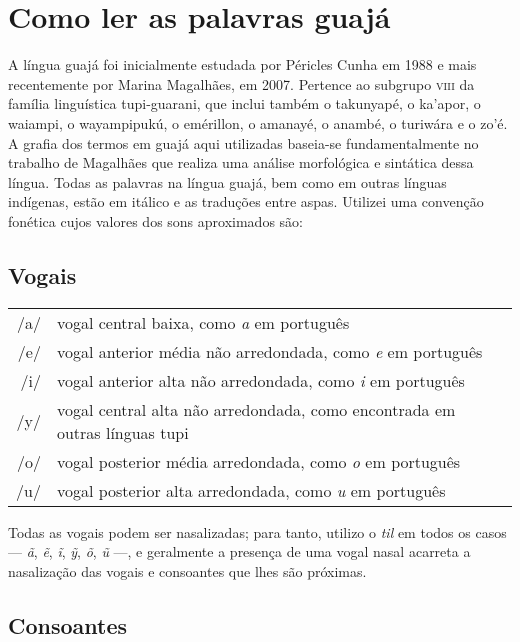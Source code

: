 \chapter{Como ler as palavras guajá}


A língua guajá foi inicialmente estudada por Péricles Cunha em 1988 e
mais recentemente por Marina Magalhães, em 2007. Pertence ao
subgrupo \textsc{viii} da família linguística tupi-guarani, que inclui também o
takunyapé, o ka'apor, o waiampi, o wayampipukú, o emérillon, o amanayé,
o anambé, o turiwára e o zo'é. %
A grafia dos termos em guajá aqui utilizadas baseia-se fundamentalmente no
trabalho de Magalhães que realiza uma análise morfológica e
sintática dessa língua. Todas as palavras na língua guajá, bem como em
outras línguas indígenas, estão em itálico e as traduções entre aspas.
Utilizei uma convenção fonética cujos valores dos sons aproximados são:

\section{Vogais}

\begin{tabular}{rl}
/a/ & vogal central baixa, como \textit{a} em português\\
/e/ & vogal anterior média não arredondada, como \textit{e} em português\\
/i/ & vogal anterior alta não arredondada, como \textit{i} em português\\
/y/ & vogal central alta não arredondada, como encontrada em outras línguas tupi\\
/o/ & vogal posterior média arredondada, como \textit{o} em português\\
/u/ & vogal posterior alta arredondada, como \textit{u} em português
\end{tabular} 

\bigskip
\medskip

Todas as vogais podem ser nasalizadas; para tanto, utilizo o \textit{til} em
todos os casos --- \textit{ã}, \textit{ẽ}, \textit{ĩ}, \textit{ỹ}, \textit{õ}, \textit{ũ} ---, e geralmente a presença de uma
vogal nasal acarreta a nasalização das vogais e consoantes que lhes são
próximas.

\section{Consoantes}

